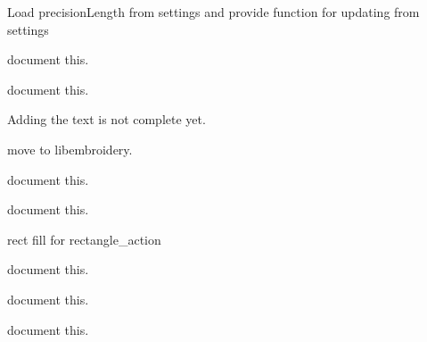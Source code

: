 \begin{DoxyRefList}
Load precision\+Length from settings and provide function for updating from settings  
\item[Member \mbox{\hyperlink{imgui__main_8c_ae29e2170871dbc827d7bc6301dad9851}{property\+\_\+editor\+\_\+hide\+All\+Groups}} (void)]\label{todo__todo000071}%
%
document this.  
\item[Member \mbox{\hyperlink{imgui__main_8c_a1b56fd1759de1b3898cfb4f72793a39c}{property\+\_\+editor\+\_\+toggle\+Pick\+Add\+Mode}} (void)]\label{todo__todo000070}%
%
document this.  
\item[Member \mbox{\hyperlink{imgui__main_8c_aa963018f80feb78d794c2980576edcc9}{quickleader\+\_\+main}} (void)]\label{todo__todo000216}%
%
Adding the text is not complete yet. 
\item[Member \mbox{\hyperlink{imgui__main_8c_abf62628119dde9fd93f65be6742e2b22}{random\+\_\+uniform}} (void)]\label{todo__todo000008}%
%
move to libembroidery. 
\item[Member \mbox{\hyperlink{imgui__main_8c_ae065faa22ca5c47d9c374749885f8a2f}{ray\+\_\+action}} (void)]\label{todo__todo000145}%
%
document this.  
\item[Member \mbox{\hyperlink{imgui__main_8c_a6ac0cd10db63ed6c5decde168076f965}{recent\+Menu\+About\+To\+Show}} (void)]\label{todo__todo000199}%
%
document this.  
\item[Member \mbox{\hyperlink{imgui__main_8c_a616bbab28522263031eafb738f5c9619}{rectangle\+\_\+action}} (void)]\label{todo__todo000116}%
%
rect fill for rectangle\+\_\+action  
\item[Member \mbox{\hyperlink{imgui__main_8c_a8a537a5e2f23d7b506a1026eeb614e81}{redo\+\_\+action}} (void)]\label{todo__todo000112}%
%
document this.  
\item[Member \mbox{\hyperlink{imgui__main_8c_a40f44fc7dc867a7cc9c67e55af4c1ad5}{redo\+\_\+navigation}} (void)]\label{todo__todo000208}%
%
document this.  
\item[Member \mbox{\hyperlink{imgui__main_8c_a491ef78f3b774b007d96522f1308f0ae}{repeat\+\_\+action}} (void)]\label{todo__todo000065}%
%
document this.  
\item[Member \mbox{\hyperlink{imgui__main_8c_af768196972a01c794c869ee4b4657e13}{resize\+\_\+event}} (void)]\label{todo__todo000202}%

\end{DoxyRefList}
